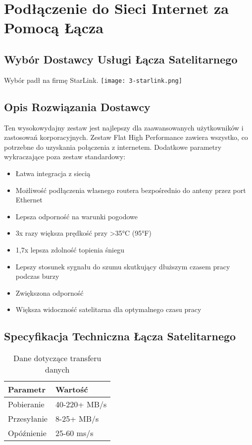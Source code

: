 \section{Podłączenie do Sieci Internet za Pomocą Łącza}
\subsection{Wybór Dostawcy Usługi Łącza Satelitarnego}
    Wybór padł na firmę StarLink.
    \texttt{[image: 3-starlink.png]}
\subsection{Opis Rozwiązania Dostawcy}
    Ten wysokowydajny zestaw jest najlepszy dla zaawansowanych użytkowników i zastosowań
    korporacyjnych. Zestaw Flat High Performance zawiera wszystko, co potrzebne do uzyskania
    połączenia z internetem. Dodatkowe parametry wykraczające poza zestaw standardowy:
    \begin{itemize}
        \item Łatwa integracja z siecią
        \item Możliwość podłączenia własnego routera bezpośrednio do anteny przez port Ethernet
        \item Lepsza odporność na warunki pogodowe
        \item 3x razy większa prędkość przy >35°C (95°F)
        \item 1,7x lepsza zdolność topienia śniegu
        \item Lepszy stosunek sygnału do szumu skutkujący dłuższym czasem pracy podczas burzy
        \item Zwiększona odporność
        \item Większa widoczność satelitarna dla optymalnego czasu pracy
    \end{itemize}
\subsection{Specyfikacja Techniczna Łącza Satelitarnego}
\begin{flushleft}
    \begin{table}[h]
        \renewcommand{\arraystretch}{1.5}
        \begin{tabular}{|l|l|}
            \hline
            \textbf{Parametr} & \textbf{Wartość} \\
            \hline
            Pobieranie & 40-220+ MB/s \\
            Przesyłanie & 8-25+ MB/s \\
            Opóźnienie & 25-60 ms/s \\
            \hline
        \end{tabular}
        \caption{Dane dotyczące transferu danych}
    \end{table}
\end{flushleft}



